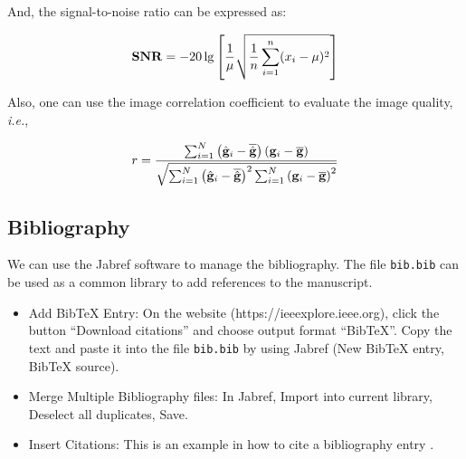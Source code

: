 And, the signal-to-noise ratio can be expressed as:

\begin{equation}\label{eq:snr}
  \mathbf{SNR} = -20\lg\left[\frac{1}{\mu}\sqrt{\frac{1}{n}\sum\limits_{i=1}^{n}(x_i-\mu)^{2}}\right]
\end{equation}

Also, one can use the image correlation coefficient to evaluate the image quality, \emph{i.e.},


\begin{equation}\label{eq:corr}
  r=\frac{\sum_{i=1}^{N}\left(\hat{\mathbf{g}}_{i}-\overline{\hat{\mathbf{g}}}\right)\left(\mathbf{g}_{i}-\overline{\mathbf{g}}\right)}{\sqrt{\sum_{i=1}^{N}\left(\hat{\mathbf{g}}_{i}-\overline{\hat{\mathbf{g}}}\right)^{2} \sum_{i=1}^{N}\left(\mathbf{g}_{i}-\overline{\mathbf{g}}\right)^{2}}}
\end{equation}

\subsection{Bibliography}

We can use the Jabref software to manage the bibliography.
The file \verb+bib.bib+ can be used as a common library to add references to the manuscript.

\begin{itemize}
  \item Add BibTeX Entry: On the website (https://ieeexplore.ieee.org), click the button ``Download citations'' and choose output format ``BibTeX''. Copy the text and paste it into the file \verb+bib.bib+ by using Jabref (New BibTeX entry, BibTeX source).    
  \item Merge Multiple Bibliography files: In Jabref, Import into current library, Deselect all duplicates, Save. 
  \item Insert Citations: This is an example in how to cite a bibliography entry \cite{cao2018, cui2019}.
\end{itemize}


